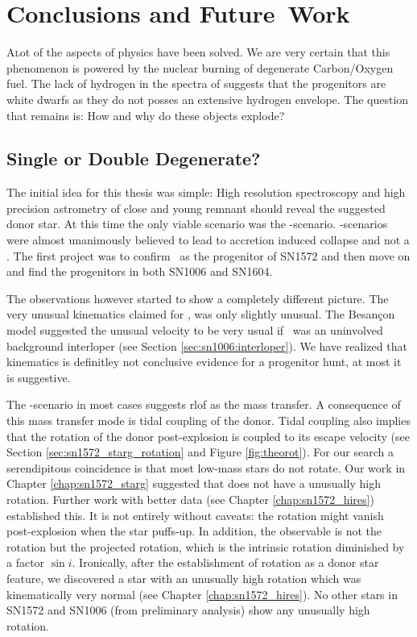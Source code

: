 \chapter{Conclusions and Future~Work}
\label{chap:four}

\lettrine{A} lot of the aspects of \snia physics have been solved. We are very certain that this phenomenon is powered by the nuclear burning of degenerate Carbon/Oxygen fuel. The lack of hydrogen in the spectra of \sneia suggests that the progenitors are white dwarfs as they do not posses an extensive hydrogen envelope. The question that remains is: How and why do these objects explode?

\section{Single or Double Degenerate?}

The initial idea for this thesis was simple: High resolution spectroscopy and high precision astrometry of close and young remnant should reveal the suggested donor star. At this time the only viable scenario was the \sd-scenario. \dd-scenarios were almost unanimously believed to lead to accretion induced collapse and not a \snia. The first project was to confirm \starg\ as the progenitor of SN1572 and then move on and find the progenitors in both SN1006 and SN1604. 

The observations however started to show a completely different picture. The very unusual kinematics claimed for \starg \citep{2004Natur.431.1069R}, was only slightly unusual. The Besan\c{c}on model suggested the unusual velocity to be very usual if \starg\ was an uninvolved background interloper (see Section \ref{sec:sn1006:interloper}). We have realized that kinematics is definitley not conclusive evidence for a progenitor hunt, at most it is suggestive. 

The \sd-scenario in most cases suggests \gls{rlof} as the mass transfer. A consequence of this mass transfer mode is tidal coupling of the donor. Tidal coupling also implies that the rotation of the donor post-explosion is coupled to its escape velocity (see Section \ref{sec:sn1572_starg_rotation} and Figure \ref{fig:theorot}). For our search a serendipitous coincidence is that most low-mass stars do not rotate. Our work in Chapter \ref{chap:sn1572_starg} suggested that \starg does not have a unusually high rotation. Further work with better data (see Chapter \ref{chap:sn1572_hires}) established this. It is not entirely without caveats: the rotation might vanish post-explosion when the star puffs-up. In addition, the observable is not the rotation but the projected rotation, which is the intrinsic rotation diminished by a factor $\sin{i}$. Ironically, after the establishment of rotation as a donor star feature, we discovered a star with an unusually high rotation which was kinematically very normal (see Chapter \ref{chap:sn1572_hires}). No other stars in SN1572 and SN1006 (from preliminary analysis) show any unusually high rotation. 

